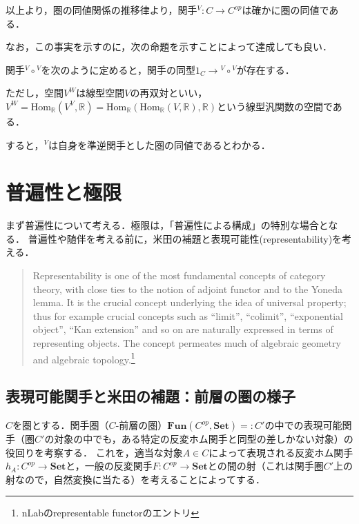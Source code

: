 \documentclass[uplatex, 12pt, dvipdfmx]{jsreport}
\begin{document}
以上より，圏の同値関係の推移律より，関手${}^V:C\to C^{op}$は確かに圏の同値である．

なお，この事実を示すのに，次の命題を示すことによって達成しても良い．
\begin{proposition}[再双対]
    関手${}^V\circ {}^V$を次のように定めると，関手の同型$1_C\to {}^V\circ {}^V$が存在する．
    \begin{center}\end{center}
    ただし，空間$V^W$は線型空間$V$の再双対といい，$V^W=\mathrm{Hom}_\mathbb{R}(V^V,\mathbb{R})=\mathrm{Hom}_\mathbb{R}(\mathrm{Hom}_\mathbb{R}(V,\mathbb{R}),\mathbb{R})$という線型汎関数の空間である．
\end{proposition}
すると，${}^V$は自身を準逆関手とした圏の同値であるとわかる．

\chapter{普遍性と極限}
まず普遍性について考える．極限は，「普遍性による構成」の特別な場合となる．
普遍性や随伴を考える前に，米田の補題と表現可能性(representability)を考える．
\begin{quotation}
    Representability is one of the most fundamental concepts of category theory, with close ties to the notion of adjoint functor and to the Yoneda lemma.
    It is the crucial concept underlying the idea of universal property; thus for example crucial concepts such as “limit”, “colimit”, “exponential object”, “Kan extension” and so on are naturally expressed in terms of representing objects.
    The concept permeates much of algebraic geometry and algebraic topology.\footnote{nLabのrepresentable functorのエントリ}
\end{quotation}

\section{表現可能関手と米田の補題：前層の圏の様子}
$C$を圏とする．関手圏（$C$-前層の圏）$\mathbf{Fun}(C^{op},\mathbf{Set})=:C'$の中での表現可能関手（圏$C'$の対象の中でも，ある特定の反変ホム関手と同型の差しかない対象）の役回りを考察する．
これを，適当な対象$A\in C$によって表現される反変ホム関手$h_A:C^{op}\to\mathbf{Set}$と，一般の反変関手$F:C^{op}\to\mathbf{Set}$との間の射（これは関手圏$C'$上の射なので，自然変換に当たる）を考えることによってする．
\end{document}
